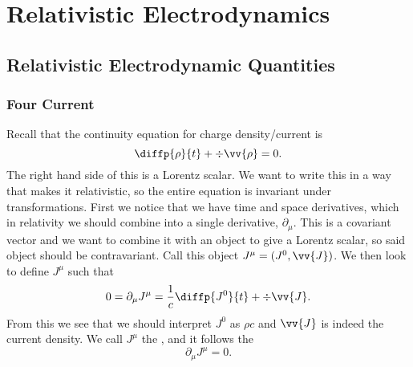 \part{Relativistic Electrodynamics}
\chapter{Relativistic Electrodynamic Quantities}
\section{Four Current}
Recall that the continuity equation for charge density/current is
\begin{equation}
    \diffp{\rho}{t} + \div\vv{\rho} = 0.
\end{equation}
The right hand side of this is a Lorentz scalar.
We want to write this in a way that makes it relativistic, so the entire equation is invariant under transformations.
First we notice that we have time and space derivatives, which in relativity we should combine into a single derivative, \(\partial_\mu\).
This is a covariant vector and we want to combine it with an object to give a Lorentz scalar, so said object should be contravariant.
Call this object \(J^\mu = (J^0, \vv{J})\).
We then look to define \(J^\mu\) such that
\begin{equation}
    0 = \partial_\mu J^\mu = \frac{1}{c}\diffp{J^0}{t} + \div \vv{J}.
\end{equation}
From this we see that we should interpret \(J^0\) as \(\rho c\) and \(\vv{J}\) is indeed the current density.
We call \(J^\mu\) the , and it follows the 
\begin{equation}
    \partial_\mu J^\mu = 0.
\end{equation}

